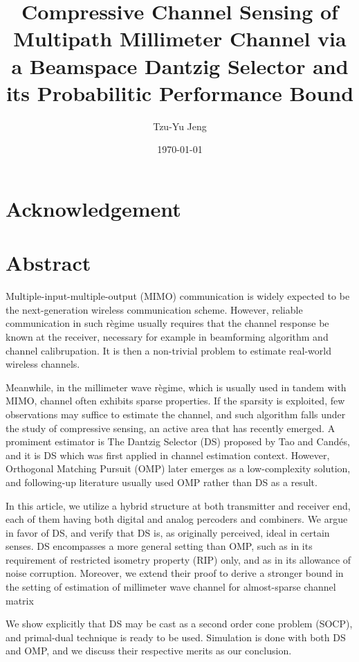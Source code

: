 \documentclass[12pt]{article}
\author{Tzu-Yu Jeng}
\date{\today}
\title{Compressive Channel Sensing of Multipath Millimeter Channel via a Beamspace Dantzig Selector and its Probabilitic Performance Bound}
\begin{document}
\maketitle

\section{Acknowledgement}


\section{Abstract}

Multiple-input-multiple-output (MIMO) communication is widely expected to be the next-generation wireless communication scheme.
However, reliable communication in such r\`egime usually requires that the channel response be known at the receiver, necessary for example in beamforming algorithm and channel calibrupation.
It is then a non-trivial problem to estimate real-world wireless channels.

Meanwhile, in the millimeter wave r\`egime, which is usually used in tandem with MIMO, channel often exhibits sparse properties.
If the sparsity is exploited, few observations may suffice to estimate the channel, and such algorithm falls under the study of compressive sensing, an active area that has recently emerged.
A promiment estimator is The Dantzig Selector (DS) proposed by Tao and Cand\'es, and it is DS which was first applied in channel estimation context.
However, Orthogonal Matching Pursuit (OMP) later emerges as a low-complexity solution, and following-up literature usually used OMP rather than DS as a result.

In this article, we utilize a hybrid structure at both transmitter and receiver end, each of them having both digital and analog percoders and combiners.
We argue in favor of DS, and verify that DS is, as originally perceived, ideal in certain senses.
DS encompasses a more general setting than OMP, such as in its requirement of restricted isometry property (RIP) only, and as in its allowance of noise corruption.
Moreover, we extend their proof to derive a stronger bound in the setting of estimation of millimeter wave channel for almost-sparse channel matrix

We show explicitly that DS may be cast as a second order cone problem (SOCP), and primal-dual technique is ready to be used.
Simulation is done with both DS and OMP, and we discuss their respective merits as our conclusion.
\end{document}
